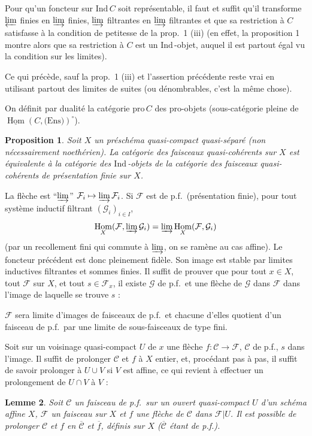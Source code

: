 \documentclass[12pt]{amsart}
\theoremstyle{plain}
\newtheorem{prop}{Proposition}[section]
\newtheorem{lem}[prop]{Lemme}
\theoremstyle{definition}
\DeclareMathOperator{\Hom}{Hom}
\newcommand{\Ind}{\text{Ind}\,}
\newcommand{\Pro}{\text{pro}\,}
\newcommand{\cF}{\mathcal{F}}
\newcommand{\cG}{\mathcal{G}}
\newcommand{\cC}{\mathcal{C}}
\begin{document}
Pour qu'un foncteur sur $\Ind C$ soit repr\'esentable, il faut et suffit qu'il transforme $\varprojlim$ finies en $\varinjlim$ finies, $\varinjlim$ filtrantes en $\varinjlim$ filtrantes et que sa restriction \`a $C$ satisfasse \`a la condition de petitesse de la prop.\ 1 (iii) (en effet, la proposition 1 montre alors que sa restriction \`a $C$ est un $\Ind$-objet, auquel il est partout \'egal vu la condition sur les limites).

Ce qui pr\'ec\`ede, sauf la prop.\ 1 (iii) et l'assertion pr\'ec\'edente reste vrai en utilisant partout des limites de suites (ou d\'enombrables, c'est la m\^eme chose).

On d\'efinit par dualit\'e la cat\'egorie $\Pro C$ des pro-objets (sous-cat\'egorie pleine de $\underline{\Hom}(C,\text{(Ens)})^{\circ}$).

\begin{prop}
Soit $X$ un pr\'esch\'ema quasi-compact quasi-s\'epar\'e (non n\'ecessairement noeth\'erien). La cat\'egorie des faisceaux quasi-coh\'erents sur $X$ est \'equivalente \`a la cat\'egorie des $\Ind$-objets de la cat\'egorie des faisceaux quasi-coh\'erents de pr\'esentation finie sur $X$.
\end{prop}

La fl\`eche est ``$\varinjlim$'' $\cF_{i} \mapsto \varinjlim \cF_{i}$. Si $\cF$ est de p.f.\ (pr\'esentation finie), pour tout syst\`eme inductif filtrant $(\cG_{i})_{i \in I}$,
\[
\Hom_{X}(\cF, \varinjlim \cG_{i}) = \varinjlim \Hom_{X}(\cF, \cG_{i})
\]
(par un recollement fini qui commute \`a $\varinjlim$, on se ram\`ene au cas affine). Le foncteur pr\'ec\'edent est donc pleinement fid\`ele. Son image est stable par limites inductives filtrantes et sommes finies. Il suffit de prouver que pour tout $x \in X$, tout $\cF$ sur $X$, et tout $s \in \cF_{x}$, il existe $\cG$ de p.f.\ et une fl\`eche de $\cG$ dans $\cF$ dans l'image de laquelle se trouve $s$ :

$\cF$ sera limite d'images de faisceaux de p.f.\ et chacune d'elles quotient d'un faisceau de p.f.\ par une limite de sous-faisceaux de type fini.

Soit sur un voisinage quasi-compact $U$ de $x$ une fl\`eche $f: \cC \to \cF$, $\cC$ de p.f., $s$ dans l'image. Il suffit de prolonger $\cC$ et $f$ \`a $X$ entier, et, proc\'edant pas \`a pas, il suffit de savoir prolonger \`a $U \cup V$ si $V$ est affine, ce qui revient \`a effectuer un prolongement de $U \cap V$ \`a $V$ :

\begin{lem}
Soit $\cC$ un faisceau de p.f.\ sur un ouvert quasi-compact $U$ d'un sch\'ema affine $X$, $\cF$ un faisceau sur $X$ et $f$ une fl\`eche de $\cC$ dans $\cF|U$. Il est possible de prolonger $\cC$ et $f$ en $\overline{\cC}$ et $\overline{f}$, d\'efinis sur $X$ ($\overline{\cC}$ \'etant de p.f.).
\end{lem}
\end{document}
